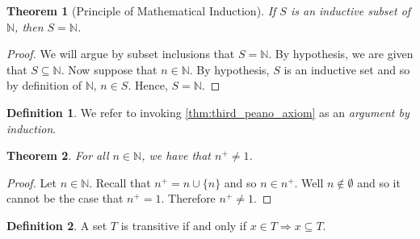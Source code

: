\documentclass{article}
\theoremstyle{definition}
\newtheorem{definition}{Definition}[section]
\theoremstyle{definition}
\theoremstyle{plain}
\theoremstyle{remark}
\theoremstyle{plain}
\newtheorem{theorem}{Theorem}[section]
\theoremstyle{remark}
\theoremstyle{plain}
\newtheorem{lemma}{Lemma}[section]
\theoremstyle{plain}
\theoremstyle{plain}
\newtheorem{axiom}{Axiom}[section]
\theoremstyle{plain}
\begin{document}
\begin{theorem}[Principle of Mathematical Induction]
  If \( S \) is an inductive subset of \( \mathbb{N} \), then 
  \( S = \mathbb{N} \).
  \label{thm:third_peano_axiom}
\end{theorem}

\begin{proof}
  We will argue by subset inclusions that \( S = \mathbb{N} \). By hypothesis, 
  we are given that \( S \subseteq \mathbb{N} \). 
  Now suppose that \( n \in \mathbb{N} \). By hypothesis, \( S \) is an 
  inductive set and so by definition of \( \mathbb{N} \), \( n \in S \). 
  Hence, \( S = \mathbb{N} \).
\end{proof}

\begin{definition}
  We refer to invoking \autoref{thm:third_peano_axiom} as an \textit{argument
  by induction}.
\end{definition}

\begin{theorem}
  For all \( n \in \mathbb{N} \), we have that \( n^{+} \neq 1 \). 
  \label{thm:fourth_peano_axiom}
\end{theorem}

\begin{proof}
  Let \( n \in \mathbb{N} \). Recall that \( n^{+} = n \cup \{ n \} \) and so 
  \( n \in n^{+} \). Well \( n \not\in \emptyset \) and so it cannot be the 
  case that \( n^{+} = 1 \). Therefore \( n^{+} \neq 1 \).
\end{proof}


% 
% 

\begin{definition}
  A set \( T \) is transitive if and only if 
  \( x \in T \Rightarrow x \subseteq T \). 
\end{definition}
\end{document}
